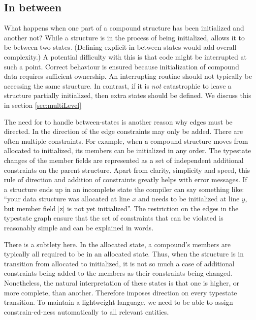 \documentclass[10pt]{amsart}
\begin{document}
\subsection{In between}

What happens when one part of a compound structure has been
initialized and another not?  While a structure is in the process of
being initialized, \Utop allows it to be between two states.
(Defining explicit in-between states would add overall complexity.)  A
potential difficulty with this is that code might be interrupted at
such a point.  Correct behaviour is ensured because initialization of
compound data requires sufficient ownership.  An interrupting routine
should not typically be accessing the same structure.  In contrast, if
it is \emph{not} catastrophic to leave a structure partially
initialized, then extra states should be defined.  We discuss this in
section \ref{sec:multiLevel}

The need for \Utop to handle between-states is another reason why
edges must be directed.  In the direction of the edge constraints may
only be added.  There are often multiple constraints.  For example,
when a compound structure moves from allocated to initialized, its
members can be initialized in any order.  The typestate changes of the
member fields are represented as a set of independent additional
constraints on the parent structure.  Apart from clarity, simplicity
and speed, this rule of direction and addition of constraints greatly
helps with error messages.  If a structure ends up in an incomplete
state the compiler can say something like: ``your data structure was
allocated at line $x$ and needs to be initialized at line $y$, but
member field |z| is not yet initialized''.  The restriction on the
edges in the typestate graph ensure that the set of constraints that
can be violated is reasonably simple and can be explained in words.

There is a subtlety here.  In the allocated state, a compound's
members are typically all required to be in an allocated state.  Thus,
when the structure is in transition from allocated to initialized, it
is not so much a case of additional constraints being added to the
members as their constraints being changed.  Nonetheless, the natural
interpretation of these states is that one is higher, or more
complete, than another.  Therefore \Utop imposes direction on every
typestate transition.  To maintain a lightweight language, we need to
be able to assign constrain-ed-ness automatically to all relevant
entities.
\end{document}
